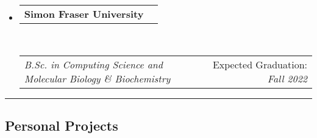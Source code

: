 \documentclass[11pt,a4paper]{article}
\makeatletter
\newcommand{\headerrow}[2]
{\begin{tabular*}{\linewidth}{l@{\extracolsep{\fill}}r}
	#1 &
	#2 \\
\end{tabular*}}
\makeatother
\begin{document}
\vspace{-0.2em}

\begin{itemize}[leftmargin=0em]

	\parskip=0.1em

	\item[] 
	\headerrow
		{\textbf{Simon Fraser University}}
        {}
	\\
	\headerrow
		{\textit{B.Sc. in Computing Science and Molecular Biology \& Biochemistry}}
		{\small{{Expected Graduation:} \textit{Fall 2022}}}
		
	

\end{itemize}

\vspace{-0.2em}
\hrule %
\vspace{-0.4em}

\subsection*{Personal Projects}

\vspace{-0.2em}
\end{document}
